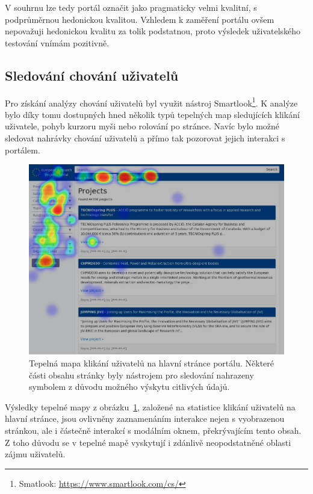 V souhrnu lze tedy portál označit jako pragmaticky velmi kvalitní, s podprůměrnou hedonickou kvalitou.
Vzhledem k zaměření portálu ovšem nepovažuji hedonickou kvalitu za tolik podstatnou, proto výsledek uživatelského testování vnímám pozitivně.




\subsection{Sledování chování uživatelů}\label{section:behaviour}
Pro získání analýzy chování uživatelů byl využit nástroj Smartlook\footnote{Smatlook: \url{https://www.smartlook.com/cs/}}. K analýze bylo díky tomu dostupných hned několik typů tepelných map sledujících klikání uživatele, pohyb kurzoru myši nebo rolování po stránce. Navíc bylo možné sledovat nahrávky chování uživatelů a přímo tak pozorovat jejich interakci s portálem.

\begin{figure}[H]
	\centering
	\includegraphics[width=\textwidth]{obrazky-figures/heatmap.png}
	\caption{Tepelná mapa klikání uživatelů na hlavní stránce portálu. Některé části obsahu stránky byly nástrojem pro sledování nahrazeny symbolem \uv{*} z důvodu možného výskytu citlivých údajů.}
	\label{img:heatmap}
\end{figure}

Výsledky tepelné mapy z obrázku~\ref{img:heatmap}, založené na statistice klikání uživatelů na hlavní stránce, jsou ovlivněny zaznamenáním interakce nejen s vyobrazenou stránkou, ale i částečně interakcí s modálním oknem, překrývajícím tento obsah. Z toho důvodu se v tepelné mapě vyskytují i zdánlivě neopodstatněné oblasti zájmu uživatelů.

